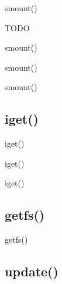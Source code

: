 \documentclass{beamer}
\begin{document}
\begin{frame}{smount()}
    \begin{algorithmic}[1]
        \State TODO
    \end{algorithmic}
\end{frame}

\begin{frame}{smount()}
\end{frame}

\begin{frame}{smount()}
\end{frame}

\begin{frame}{smount()}
\end{frame}




\subsection{iget()}

\begin{frame}{iget()}
\end{frame}

\begin{frame}{iget()}
\end{frame}

\begin{frame}{iget()}
\end{frame}




\subsection{getfs()}

\begin{frame}{getfs()}
\end{frame}




\subsection{update()}
\end{document}
